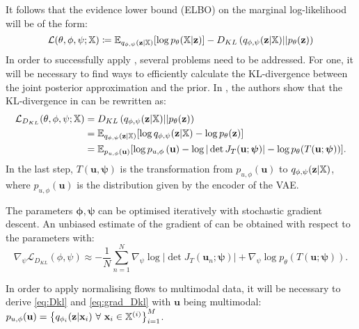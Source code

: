 \documentclass[english]{scrartcl}
\begin{document}
    It follows that the evidence lower bound (ELBO) on the marginal log-likelihood will be of the form:
    \begin{equation}
        \label{eq:elbo}
        \mathcal{L}(\theta, \phi, \psi; \mathbb{X}) \coloneqq \mathbb{E}_{q_{\phi, \psi}(\textbf{z}|\mathbb{X})}[\log p_{\theta}(\mathbb{X}|\textbf{z})] - D_{KL} \left( q_{\phi, \psi}(\textbf{z}|\mathbb{X}) ||p_{\theta}(\textbf{z})\right)
    \end{equation}
    In order to successfully apply , several problems need to be addressed.
    For one, it will be necessary to find ways to efficiently calculate the KL-divergence between the joint posterior approximation and the prior.
    In \citet{papamakarios_normalizing_2019}, the authors show that the KL-divergence in  can be rewritten as:
    \begin{equation}
        \label{eq:Dkl}
        \begin{split}
            \mathcal{L}_{D_{KL}}(\theta, \phi, \psi; \mathbb{X}) & =D_{KL} \left( q_{\phi, \psi}(\textbf{z}|\mathbb{X}) || p_{\theta}(\textbf{z}) \right)\\
            & = \mathbb{E}_{q_{\phi, \psi}(\textbf{z}|\mathbb{X})}[\log q_{\phi, \psi}(\textbf{z}|\mathbb{X}) - \log p_{\theta}(\textbf{z})]\\
            & = \mathbb{E}_{p_{u,\phi}(\textbf{u})}[\log p_{u,\phi} \left(\textbf{u} \right) - \log |\det J_{T}(\textbf{u}; \boldsymbol{\psi})|- \log p_{\theta}(T(\textbf{u}; \boldsymbol{\psi}))].
        \end{split}
    \end{equation}
    In the last step, $T(\textbf{u},\boldsymbol{\psi})$ is the transformation from $p_{u,\phi}(\textbf{u})$ to $q_{\phi, \psi}(\textbf{z}|\mathbb{X})$, where $p_{u,\phi}(\textbf{u})$ is the distribution given by the encoder of the VAE.

    The parameters $\boldsymbol{\phi}, \boldsymbol{\psi}$ can be optimised iteratively with stochastic gradient descent.
    An unbiased estimate of the gradient of  can be obtained with respect to the parameters with:
    \begin{equation}\label{eq:grad_Dkl}
        \nabla _{\psi} \mathcal{L}_{D_{KL}}(\phi, \psi) \approx - \frac{1}{N} \sum ^N _{n=1}   \nabla _{\psi}\log |\det J_{T}(\textbf{u}_n; \boldsymbol{\psi})| + \nabla _{\psi} \log p_{\theta}(T(\textbf{u}; \boldsymbol{\psi})).
    \end{equation}
    
    In order to apply normalising flows to multimodal data, it will be necessary to derive \cref{eq:Dkl} and \cref{eq:grad_Dkl} with $\textbf{u}$ being multimodal: $p_{u,\phi}(\textbf{u}) = \left\{ q_{\phi _i}(\textbf{z}|\textbf{x}_i)\ \forall\ \textbf{x}_i \in \mathbb{X}^{(i)} \right\}_{i=1}^M$.
\end{document}
